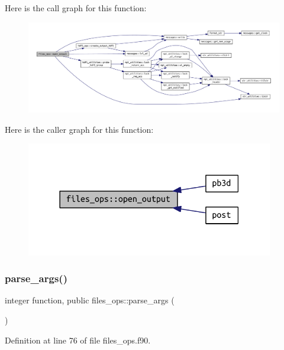 Here is the call graph for this function\+:
\nopagebreak
\begin{figure}[H]
\begin{center}
\leavevmode
\includegraphics[width=350pt]{namespacefiles__ops_ad681a9e8083a6f664cf0f9d17ebe279c_cgraph}
\end{center}
\end{figure}
Here is the caller graph for this function\+:
\nopagebreak
\begin{figure}[H]
\begin{center}
\leavevmode
\includegraphics[width=306pt]{namespacefiles__ops_ad681a9e8083a6f664cf0f9d17ebe279c_icgraph}
\end{center}
\end{figure}
\mbox{\label{namespacefiles__ops_a051584112f6e4f6e60b0ef824dffbf5e}} 
\subsubsection{\texorpdfstring{parse\+\_\+args()}{parse\_args()}}
{\footnotesize\ttfamily integer function, public files\+\_\+ops\+::parse\+\_\+args (\begin{DoxyParamCaption}{ }\end{DoxyParamCaption})}



Definition at line 76 of file files\+\_\+ops.\+f90.

